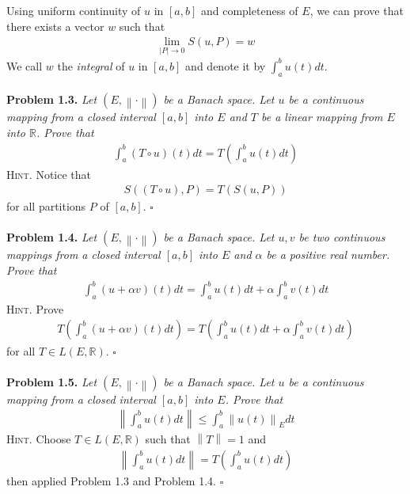 \documentclass[a4paper]{article}
\numberwithin{equation}{section}
\begin{document}
Using uniform continuity of $u$ in $\left[a,b\right]$ and completeness of $E$, we can prove that there exists a vector $w$ such that
\begin{align}
\mathop {\lim }\limits_{\left| P \right| \to 0} S\left( {u,P} \right) = w
\end{align}
We call $w$ the \textit{integral} of $u$ in $\left[a,b\right]$ and denote it by $\int_a^b {u\left( t \right)dt} $.\\
\\
\textbf{Problem 1.3.} \textit{Let $\left( {E,\left\|  \cdot  \right\|} \right)$ be a Banach space. Let $u$ be a continuous mapping from a closed interval $\left[a,b\right]$ into $E$ and $T$ be a linear mapping from $E$ into $\mathbb{R}$. Prove that}
\begin{align}
\int_a^b {\left( {T \circ u} \right)\left( t \right)dt}  = T\left( {\int_a^b {u\left( t \right)dt} } \right)
\end{align}
\textsc{Hint.} Notice that
\begin{align}
S\left( {\left( {T \circ u} \right),P} \right) = T\left( {S\left( {u,P} \right)} \right)
\end{align}
for all partitions $P$ of $\left[a,b\right]$. \hfill $\square$\\
\\
\textbf{Problem 1.4.} \textit{Let $\left( {E,\left\|  \cdot  \right\|} \right)$ be a Banach space. Let $u,v$ be two continuous mappings from a closed interval $\left[a,b\right]$ into $E$ and $\alpha$ be a positive real number. Prove that}
\begin{align}
\int_a^b {\left( {u + \alpha v} \right)\left( t \right)dt}  = \int_a^b {u\left( t \right)dt}  + \alpha \int_a^b {v\left( t \right)dt} 
\end{align}
\textsc{Hint.} Prove 
\begin{align}
T\left( {\int_a^b {\left( {u + \alpha v} \right)\left( t \right)dt} } \right) = T\left( {\int_a^b {u\left( t \right)dt}  + \alpha \int_a^b {v\left( t \right)dt} } \right)
\end{align}
for all $T \in L\left( {E,\mathbb{R}} \right)$. \hfill $\square$\\
\\
\textbf{Problem 1.5.} \textit{Let $\left( {E,\left\|  \cdot  \right\|} \right)$ be a Banach space. Let $u$ be a continuous mapping from a closed interval $\left[a,b\right]$ into $E$. Prove that}
\begin{align}
\left\| {\int_a^b {u\left( t \right)dt} } \right\| \le \int_a^b {{{\left\| {u\left( t \right)} \right\|}_E}dt} 
\end{align}
\textsc{Hint.} Choose $T \in L\left( {E,\mathbb{R}} \right)$ such that $\left\| T \right\| = 1$ and
\begin{align}
\left\| {\int_a^b {u\left( t \right)dt} } \right\| = T\left( {\int_a^b {u\left( t \right)dt} } \right)
\end{align}
then applied Problem 1.3 and Problem 1.4. \hfill $\square$
\end{document}
